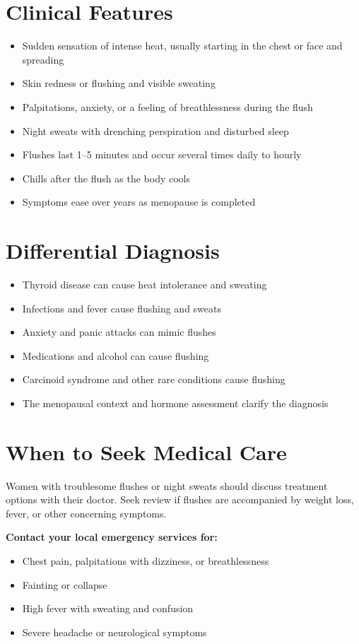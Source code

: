 \section*{Clinical Features}
\begin{itemize}
    \item Sudden sensation of intense heat, usually starting in the chest or face and spreading
    \item Skin redness or flushing and visible sweating
    \item Palpitations, anxiety, or a feeling of breathlessness during the flush
    \item Night sweats with drenching perspiration and disturbed sleep
    \item Flushes last 1--5 minutes and occur several times daily to hourly
    \item Chills after the flush as the body cools
    \item Symptoms ease over years as menopause is completed
\end{itemize}

\section*{Differential Diagnosis}
\begin{itemize}
    \item Thyroid disease can cause heat intolerance and sweating
    \item Infections and fever cause flushing and sweats
    \item Anxiety and panic attacks can mimic flushes
    \item Medications and alcohol can cause flushing
    \item Carcinoid syndrome and other rare conditions cause flushing
    \item The menopausal context and hormone assessment clarify the diagnosis
\end{itemize}

\section*{When to Seek Medical Care}
Women with troublesome flushes or night sweats should discuss treatment options with their doctor. Seek review if flushes are accompanied by weight loss, fever, or other concerning symptoms.

\textbf{Contact your local emergency services for:}
\begin{itemize}
    \item Chest pain, palpitations with dizziness, or breathlessness
    \item Fainting or collapse
    \item High fever with sweating and confusion
    \item Severe headache or neurological symptoms
\end{itemize}

